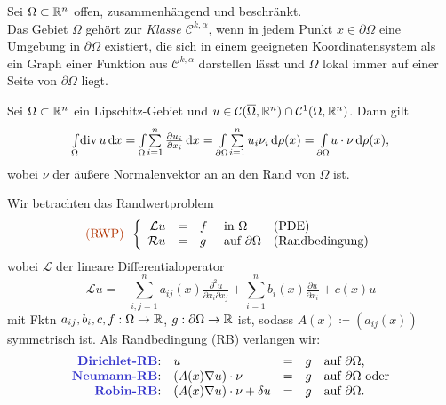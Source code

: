 \documentclass{cheat-sheet}
\newcommand{\Cont}{\mathcal{C}} %
\newcommand{\clos}[1]{\overline{#1}} %
\newcommand{\cOmega}{\clos{\Omega}} %
\newcommand{\bOmega}{\partial \Omega} %
\newcommand{\IntOmega}[2]{\AInt{\Omega}{#1}{#2}} %
\newcommand{\IntbOmega}[2]{\AInt{\bOmega}{#1}{#2}} %
\newcommand{\LL}{\mathcal{L}} %
\newcommand{\RR}{\mathcal{R}} %
\DeclareMathOperator{\dive}{div} %
\newcommand{\probl}[1]{\textcolor{ProblemColor}{#1}}
\begin{document}
\begin{defn}
  Sei $\Omega \subset \mathbb{R}^n$ offen, zusammenhängend und beschränkt. \\
  Das Gebiet $\Omega$ gehört zur \emph{Klasse $\Cont^{k,\alpha}$}, wenn in jedem Punkt $x \in \bOmega$ eine Umgebung in $\bOmega$ existiert, die sich in einem geeigneten Koordinatensystem als ein Graph einer Funktion aus $\Cont^{k,\alpha}$ darstellen lässt und $\Omega$ lokal immer auf einer Seite von $\bOmega$ liegt.
\end{defn}


\begin{satz}
  Sei $\Omega \subset \mathbb{R}^n$ ein Lipschitz-Gebiet und $u \in \Cont(\cOmega, \R^n) \cap \Cont^1(\Omega, \R^n)$.
  Dann gilt
  \[ \IntOmega{\dive u}{x} = \IntOmega{\sum_{i=1}^n \tfrac{\partial u_i}{\partial x_i}}{x} = \IntbOmega{\sum_{i=1}^n u_i \nu_i}{\rho(x)} = \IntbOmega{u \cdot \nu}{\rho(x)}, \]
  wobei $\nu$ der äußere Normalenvektor an an den Rand von $\Omega$ ist.
\end{satz}

\begin{prob}
  Wir betrachten das Randwertproblem
  \[
    \text{\probl{(RWP)}} \enspace \left\{ \begin{array}{rllll}
      \LL u &=& f &\text{ in $\Omega$} & \text{(PDE)} \\
      \RR u &=& g &\text{ auf $\bOmega$} & \text{(Randbedingung)}
    \end{array} \right.
  \]
  wobei $\LL$ der lineare Differentialoperator
  \[
    \LL u = - \sum_{i,j=1}^n a_{ij}(x) \tfrac{\partial^2 u}{\partial x_i \partial x_j} + \sum_{i=1}^n b_i(x) \tfrac{\partial u}{\partial x_i} + c(x) u
  \]
  mit Fktn $a_{ij}, b_i, c, f : \Omega \to \mathbb{R}$, $g : \bOmega \to \R$ ist, sodass $A(x) \coloneqq (a_{ij}(x))$ symmetrisch ist.
  Als Randbedingung (RB) verlangen wir:
  \[ \begin{array}{rllll}
    \text{\emph{Dirichlet-RB}:} & u &=& g & \text{auf $\bOmega$,} \\
    \text{\emph{Neumann-RB}:} & (A(x) \nabla u) \cdot \nu &=& g & \text{auf $\bOmega$ oder} \\
    \text{\emph{Robin-RB}:} & (A(x) \nabla u) \cdot \nu + \delta u &=& g & \text{auf $\bOmega$.}
  \end{array} \]
\end{prob}
\end{document}
